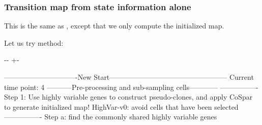\documentclass[letterpaper,10pt,english]{sphinxmanual}
\newlength\nbsphinxcodecellspacing
\begin{document}
\subsubsection{Transition map from state information alone}
\label{\detokenize{20210121_cospar_tutorial:Transition-map-from-state-information-alone}}
This is the same as , except that we only compute the initialized map.

Let us try  method:

{
\begin{sphinxVerbatim}[commandchars=\\\{\}]
\llap{\color{nbsphinxin}[40]:\,\hspace{\fboxrule}\hspace{\fboxsep}}\PYG{p}{[}\PYG{p}{]} 
        \PYG{p}{[}\PYG{p}{]}
\end{sphinxVerbatim}
}

{

\kern-\sphinxverbatimsmallskipamount\kern-\baselineskip
\kern+\FrameHeightAdjust\kern-\fboxrule
\vspace{\nbsphinxcodecellspacing}

\begin{sphinxVerbatim}[commandchars=\\\{\}]
-------------------------------New Start--------------------------------------------------
Current time point: 4
-----------Pre-processing and sub-sampling cells------------
----------------
Step 1: Use highly variable genes to construct pseudo-clones, and apply CoSpar to generate initialized map!
HighVar-v0: avoid cells that have been selected
----------------
Step a: find the commonly shared highly variable genes
\end{sphinxVerbatim}
}
\end{document}
